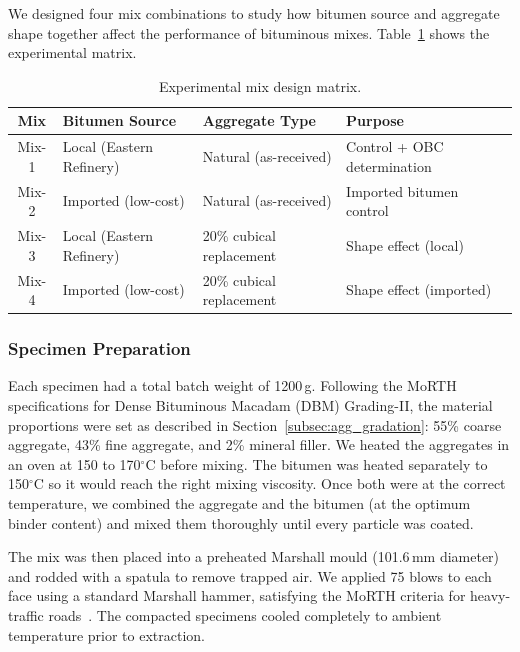 \documentclass[12pt,a4paper]{article}
\begin{document}
We designed four mix combinations to study how bitumen source and aggregate shape together affect the performance of bituminous mixes. Table~\ref{tab:mix_matrix} shows the experimental matrix.

\begin{table}[htbp]
    \centering
    \caption{Experimental mix design matrix.}
    \label{tab:mix_matrix}
    \begin{tabular}{@{}clll@{}}
        \toprule
        \textbf{Mix} & \textbf{Bitumen Source} & \textbf{Aggregate Type} & \textbf{Purpose} \\
        \midrule
        Mix-1 & Local (Eastern Refinery) & Natural (as-received) & Control + OBC determination \\
        Mix-2 & Imported (low-cost) & Natural (as-received) & Imported bitumen control \\
        Mix-3 & Local (Eastern Refinery) & 20\% cubical replacement & Shape effect (local) \\
        Mix-4 & Imported (low-cost) & 20\% cubical replacement & Shape effect (imported) \\
        \bottomrule
    \end{tabular}
\end{table}

\subsubsection{Specimen Preparation}

Each specimen had a total batch weight of 1200\,g. Following the MoRTH specifications for Dense Bituminous Macadam (DBM) Grading-II, the material proportions were set as described in Section~\ref{subsec:agg_gradation}: 55\% coarse aggregate, 43\% fine aggregate, and 2\% mineral filler. We heated the aggregates in an oven at 150 to 170$^{\circ}$C before mixing. The bitumen was heated separately to 150$^{\circ}$C so it would reach the right mixing viscosity. Once both were at the correct temperature, we combined the aggregate and the bitumen (at the optimum binder content) and mixed them thoroughly until every particle was coated.

The mix was then placed into a preheated Marshall mould (101.6\,mm diameter) and rodded with a spatula to remove trapped air. We applied 75 blows to each face using a standard Marshall hammer, satisfying the MoRTH criteria for heavy-traffic roads~\cite{rajkumar2018experimental}. The compacted specimens cooled completely to ambient temperature prior to extraction.
\end{document}
